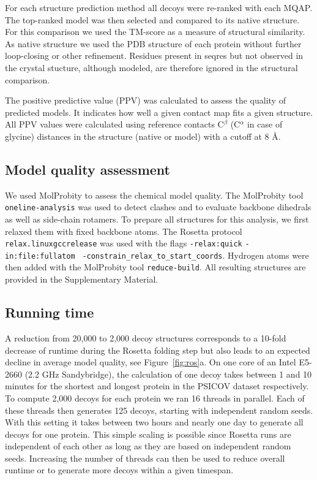 \documentclass{bioinfo}
\begin{document}
\begin{methods}
For each structure prediction method all decoys were re-ranked with
each MQAP. The top-ranked model was then selected and compared to its
native structure. For this comparison we used the TM-score
\cite[]{zhang_scoring_2004} as a measure of structural similarity. As
native structure we used the PDB structure of each protein without
further loop-closing or other refinement. Residues present in seqres
but not observed in the crystal stucture, although modeled, are therefore ignored in the structural
comparison.

The positive predictive value (PPV) was calculated to assess the
quality of predicted models. It indicates how well a given contact map
fits a given structure. All PPV values were calculated using reference
contacts C$^{\beta}$ (C$^{\alpha}$ in case of glycine) distances in
the structure (native or model) with a cutoff at 8 \AA.


\subsection{Model quality assessment}

We used MolProbity \cite[]{chen_molprobity:_2010} to assess the chemical
model quality. The MolProbity tool {\tt oneline-analysis} was used to 
detect clashes and to evaluate backbone dihedrals as well as 
side-chain rotamers. To prepare all structures for this analysis, we 
first relaxed them with fixed backbone atoms.
The Rosetta protocol {\tt relax.linuxgccrelease} was used with the flags 
{\tt -relax:quick} {\tt -in:file:fullatom} {\tt 
-constrain\_relax\_to\_start\_coords}. Hydrogen atoms were then 
added with the MolProbity tool {\tt reduce-build}. All resulting 
structures are provided in the Supplementary Material.



\subsection{Running time}
A reduction from 20,000 to 2,000 decoy structures corresponds to a 10-fold
decrease of runtime during the Rosetta folding step but also leads to an
expected decline in average model quality{\color{red}, see Figure~\ref{fig:ros}a}. On one core of an Intel
E5-2660 (2.2 GHz Sandybridge), the calculation of one decoy takes
between 1 and 10 minutes for the shortest and longest protein in the
PSICOV dataset respectively. To compute 2,000 decoys for each protein
we ran 16 threads in parallel. Each of these threads then generates
125 decoys, starting with independent random seeds. With this setting
it takes between two hours and nearly one day to generate all decoys
for one protein. This simple scaling is possible since Rosetta runs
are independent of each other as long as they are based on 
independent random seeds. Increasing the number of threads can then be used to reduce
overall runtime or to generate more decoys within a given timespan.

\end{methods}
\end{document}
